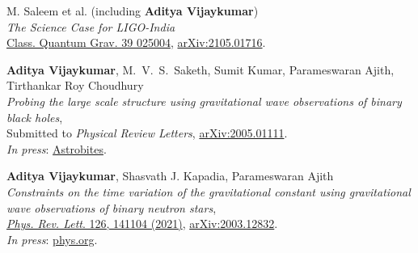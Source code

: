 \begin{etaremune}
	\item M. Saleem et al. (including \textbf{Aditya Vijaykumar})\\
	\textit{The Science Case for LIGO-India}\\
	\href{https://iopscience.iop.org/article/10.1088/1361-6382/ac3b99}{Class. Quantum Grav. 39 025004}, \href{https://arxiv.org/abs/2105.01716}{arXiv:2105.01716}.
	
	\item 
	\textbf{Aditya Vijaykumar}, M.~V.~S.~Saketh, Sumit Kumar, Parameswaran Ajith, Tirthankar Roy Choudhury\\
	\textit{Probing the large scale structure using gravitational wave observations of binary black holes},\\
	Submitted to \textit{Physical Review Letters}, \href{https://arxiv.org/abs/2005.01111}{arXiv:2005.01111}.\\
	\textit{In press}: \href{https://astrobites.org/2020/05/07/binary-black-holes-tangled-up-in-the-cosmic-web/}{Astrobites}.
	
	\item 
	\textbf{Aditya Vijaykumar}, Shasvath J. Kapadia, Parameswaran Ajith\\
	\textit{Constraints on the time variation of the gravitational constant using gravitational wave observations of binary neutron stars},\\
	\href{https://journals.aps.org/prl/abstract/10.1103/PhysRevLett.126.141104}{\textit{Phys. Rev. Lett}. 126, 141104 (2021)}, \href{https://arxiv.org/abs/2003.12832}{arXiv:2003.12832}.\\
	\textit{In press}: \href{https://phys.org/news/2021-05-constraints-variation-gravitational-constant.html}{phys.org}.

\end{etaremune}

